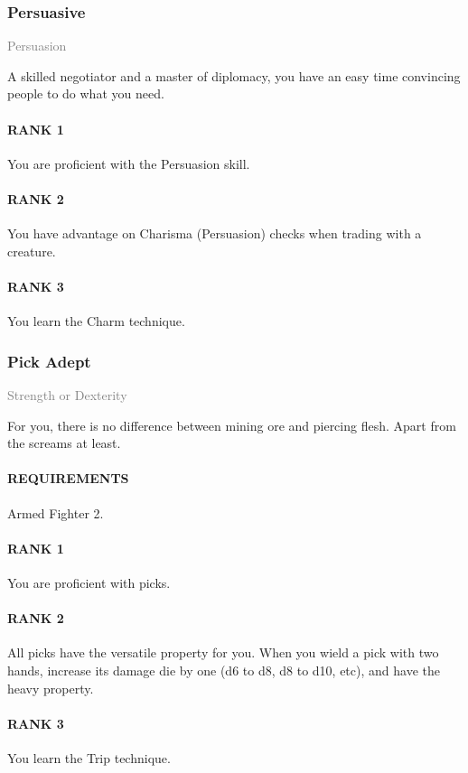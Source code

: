 \subsubsection{Persuasive} \label{tal::persuasive}
\small{\textcolor{gray}{Persuasion}}

\normalsize
A skilled negotiator and a master of diplomacy, you have an easy time convincing people to do what you need.
\paragraph{RANK 1} You are proficient with the Persuasion skill.
\paragraph{RANK 2} You have advantage on Charisma (Persuasion) checks when trading with a creature.
\paragraph{RANK 3} You learn the Charm technique.

\subsubsection{Pick Adept} \label{tal::pickadept}
\small{\textcolor{gray}{Strength or Dexterity}}

\normalsize
For you, there is no difference between mining ore and piercing flesh.
Apart from the screams at least.
\paragraph{REQUIREMENTS} Armed Fighter 2.
\paragraph{RANK 1} You are proficient with picks.
\paragraph{RANK 2} All picks have the versatile property for you.
When you wield a pick with two hands, increase its damage die by one (d6 to d8, d8 to d10, etc), and have the heavy property.
\paragraph{RANK 3} You learn the Trip technique.

